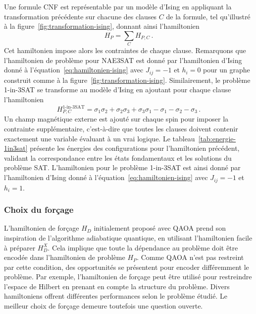 Une formule CNF est représentable par un modèle d'Ising en appliquant la transformation précédente sur chacune des clauses $C$ de la formule, tel qu'illustré à la figure~\ref{fig:transformation-ising}, donnant ainsi l'hamiltonien 
\begin{equation}
    H_{P} = \sum_{C} H_{P, C} \,.
\end{equation}
Cet hamiltonien impose alors les contraintes de chaque clause. Remarquons que l'hamiltonien de problème pour NAE3SAT est donné par l'hamiltonien d'Ising donné à l'équation~\ref{eq:hamiltonien-ising} avec $J_{ij}=-1$ et $h_{i}=0$ pour un graphe construit comme à la figure~\ref{fig:transformation-ising}. Similairement, le problème 1-in-3SAT se transforme au modèle d'Ising en ajoutant pour chaque clause l'hamiltonien
\begin{equation}
   H_{P, C}^{\text{1-in-3SAT}} = \sigma_{1}\sigma_{2} + \sigma_{2}\sigma_{3} + \sigma_{3}\sigma_{1} - \sigma_{1} - \sigma_{2} - \sigma_{3} \,.
\end{equation}
Un champ magnétique externe est ajouté sur chaque spin pour imposer la contrainte supplémentaire, c'est-à-dire que toutes les clauses doivent contenir exactement une variable évaluant à un vrai logique. Le tableau~\ref{tab:energie-1in3sat} présente les énergies des configurations pour l'hamiltonien précédent, validant la correspondance entre les états fondamentaux et les solutions du problème SAT. L'hamiltonien pour le problème 1-in-3SAT est ainsi donné par l'hamiltonien d'Ising donné à l'équation~\ref{eq:hamiltonien-ising} avec $J_{ij}=-1$ et $h_{i}=1$.


\subsubsection{Choix du forçage}

L'hamiltonien de forçage $H_{D}$ initialement proposé avec QAOA prend son inspiration de l'algorithme adiabatique quantique, en utilisant l'hamiltonien facile à préparer $H_{D}^{X}$. Cela implique que toute la dépendance au problème doit être encodée dans l'hamiltonien de problème $H_{P}$. Comme QAOA n'est pas restreint par cette condition, des opportunités se présentent pour encoder différemment le problème. Par exemple, l'hamiltonien de forçage peut être utilisé pour restreindre l'espace de Hilbert en prenant en compte la structure du problème. Divers hamiltoniens offrent différentes performances selon le problème étudié. Le meilleur choix de forçage demeure toutefois une question ouverte.

